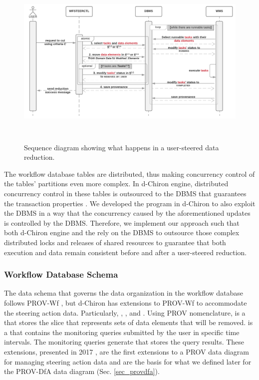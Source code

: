 \begin{figure}[H]
    \centering
    \includegraphics[width=6.06299in,height=3.30315in]{img/dChironSeqDiagram.pdf}
    \caption{Sequence diagram showing what happens in a user-steered data reduction.}
    \label{fig:seq_diagram_data_reduction}
\end{figure}

The workflow database tables are distributed, thus making concurrency control
of the tables' partitions even more complex. In d-Chiron engine,
distributed concurrency control in these tables is outsourced to the
DBMS that guarantees the  transaction properties \cite{Ozsu2011Principles}.
We developed the
 program in d-Chiron to also exploit the DBMS in a way that the concurrency
caused by the aforementioned updates is controlled by the DBMS.
Therefore, we implement our approach such that both d-Chiron engine and
the  rely on the DBMS to outsource those complex distributed
locks and releases of shared resources to guarantee that both execution
and data remain consistent before and after a user-steered reduction.

\subsubsection{Workflow Database Schema}

The data schema that governs the data organization in the workflow database
follows PROV-Wf \cite{Costa2013Capturing}, but d-Chiron has extensions to PROV-Wf to accommodate the steering action data. 
Particularly,
, ,
and . Using PROV nomenclature,
 is a  that stores the slice that represents sets of data elements that will be removed. 
is a  that contains the monitoring queries submitted
by the user in specific time intervals. The monitoring queries generate
 
that stores the query results. These extensions, presented in 2017 \cite{Souza2017Data}, are the first extensions to a PROV data diagram for managing steering action data and are the basis for what we defined later for the PROV-DfA data diagram \cite{Souza2018Provenance} (Sec. \ref{sec_provdfa}).

